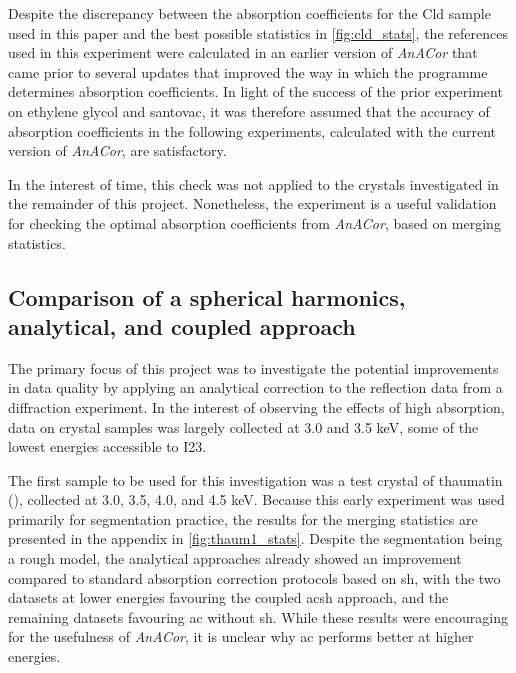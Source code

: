 Despite the discrepancy between the absorption coefficients for the Cld sample used in this paper and the best possible statistics in \cref{fig:cld_stats}, the references used in this experiment were calculated in an earlier version of \textit{AnACor} that came prior to several updates that improved the way in which the programme determines absorption coefficients. In light of the success of the prior experiment on ethylene glycol and santovac, it was therefore assumed that the accuracy of absorption coefficients in the following experiments, calculated with the current version of \textit{AnACor}, are satisfactory. %

In the interest of time, this check was not applied to the crystals investigated in the remainder of this project. Nonetheless, the experiment is a useful validation for checking the optimal absorption coefficients from \textit{AnACor}, based on merging statistics. %


\subsection{Comparison of a spherical harmonics, analytical, and coupled approach} %
The primary focus of this project was to investigate the potential improvements in data quality by applying an analytical correction to the reflection data from a diffraction experiment.
In the interest of observing the effects of high absorption, data on crystal samples was largely collected at 3.0 and 3.5 \unit{keV}, some of the lowest energies accessible to I23.

The first sample to be used for this investigation was a test crystal of thaumatin (), collected at 3.0, 3.5, 4.0, and 4.5 \unit{keV}. Because this early experiment was used primarily for segmentation practice, the results for the merging statistics are presented in the appendix in \cref{fig:thaum1_stats}. Despite the segmentation being a rough model, the analytical approaches already showed an improvement compared to standard absorption correction protocols based on \ac{sh}, with the two datasets at lower energies favouring the coupled \ac{acsh} approach, and the remaining datasets favouring \ac{ac} without \ac{sh}. While these results were encouraging for the usefulness of \textit{AnACor}, it is unclear why \ac{ac} performs better at higher energies. 

